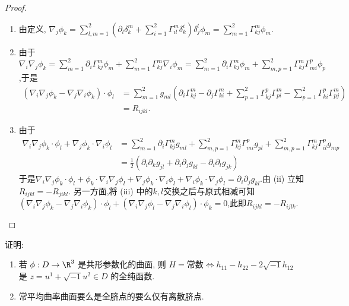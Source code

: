 	\begin{proof}
		\begin{enumerate}[label=(\roman*)]
			\item 由定义, $\displaystyle \nabla_{j}\phi_{k}=\sum_{l,m=1}^{2}\left(\partial_{l}\delta_{k}^{m}+\sum_{i=1}^{2}\Gamma_{il}^{m}\delta_{k}^{i}\right)\delta_{j}^{l}\phi_{m}=\sum_{m=1}^{2}\Gamma_{kj}^{m}\phi_{m}$.
			\item 由于$\displaystyle \nabla_{i}\nabla_{j}\phi_{k}=\sum_{m=1}^{2}\partial_{i}\Gamma_{kj}^{m}\phi_{m}+\sum_{m=1}^{2}\Gamma_{kj}^{m}\nabla_{i}\phi_{m}=\sum_{m=1}^{2}\partial_{i}\Gamma_{kj}^{m}\phi_{m}+\sum_{m,p=1}^{2}\Gamma_{kj}^{m}\Gamma_{mi}^{p}\phi_{p}$,于是
			\begin{align*}
				(\nabla_{i}\nabla_{j}\phi_{k}-\nabla_{j}\nabla_{i}\phi_{k})\cdot\phi_{l}&=\sum_{m=1}^{2}g_{ml}\left(\partial_{i}\Gamma_{kj}^{m}-\partial_{j}\Gamma_{ki}^{m}+\sum_{p=1}^{2}\Gamma_{kj}^{p}\Gamma_{pi}^{m}-\sum_{p=1}^{2}\Gamma_{ki}^{p}\Gamma_{pj}^{m}\right)\\
				&=R_{ijkl}.
			\end{align*}
			\item 由于
			\begin{align*}
				\nabla_{i}\nabla_{j}\phi_{k}\cdot\phi_{l}+\nabla_{j}\phi_{k}\cdot \nabla_{i}\phi_{l}&=\sum_{m=1}^{2}\partial_{i}\Gamma_{kj}^{m}g_{ml}+\sum_{m,p=1}^{2}\Gamma_{kj}^{m}\Gamma_{mi}^{p}g_{pl}+\sum_{m,p=1}^{2}\Gamma_{kj}^{m}\Gamma_{il}^{p}g_{mp}\\
				&=\frac{1}{2}(\partial_{i}\partial_{k}g_{jl}+\partial_{i}\partial_{j}g_{kl}-\partial_{i}\partial_{l}g_{jk})
			\end{align*}
			于是$\nabla_{i}\nabla_{j}\phi_{k}\cdot\phi_{l}+\phi_{k}\cdot\nabla_{i}\nabla_{j}\phi_{l}+\nabla_{j}\phi_{k}\cdot\nabla_{i}\phi_{l}+\nabla_{i}\phi_{k}\cdot\nabla_{j}\phi_{l}=\partial_{i}\partial_{j}g_{kl}$.由 (ii) 立知$R_{ijkl}=-R_{jikl}$.
            另一方面,将 (iii) 中的$k,l$交换之后与原式相减可知$(\nabla_{i}\nabla_{j}\phi_{k}-\nabla_{j}\nabla_{i}\phi_{k})\cdot\phi_{l}+(\nabla_{i}\nabla_{j}\phi_{l}-\nabla_{j}\nabla_{i}\phi_{l})\cdot\phi_{k}=0$,此即$R_{ijkl}=-R_{ijlk}$.\qedhere
		\end{enumerate}
	\end{proof}
	\begin{excise}\label{9.3}
		证明:
		\begin{enumerate}[label=(\roman*)]
			\item\label{9.3.1} 若 $\phi : D \to \R^3 $ 是共形参数化的曲面, 则
			$H = $常数$\Leftrightarrow h_{11} - h_{22} - 2\sqrt{-1}h_{12}$ 是 $z = u^1 + \sqrt{-1}u^2 \in D$ 的全纯函数.
			\item 常平均曲率曲面要么是全脐点的要么仅有离散脐点.
		\end{enumerate}
	\end{excise}
